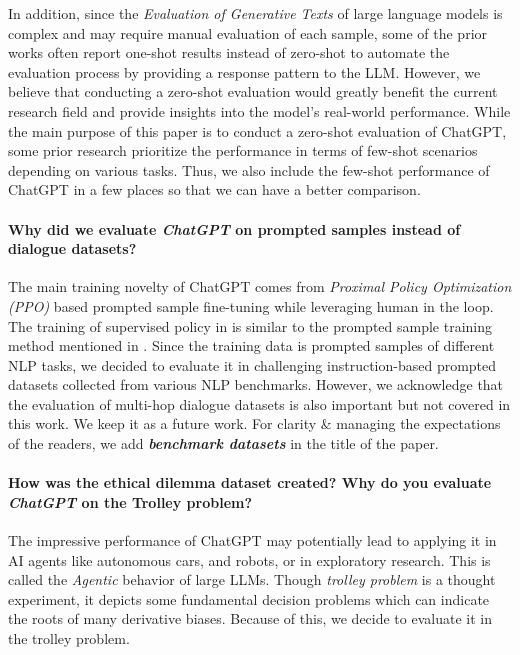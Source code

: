 \documentclass[11pt]{article}
\begin{document}
In addition, since the \emph{Evaluation of Generative Texts} of large language models is complex and may require manual evaluation of each sample, some of the prior works often report one-shot results instead of zero-shot to automate the evaluation process by providing a response pattern to the LLM. However, we believe that conducting a zero-shot evaluation would greatly benefit the current research field and provide insights into the model's real-world performance. While the main purpose of this paper is to conduct a zero-shot evaluation of ChatGPT, some prior research prioritize the performance in terms of few-shot scenarios depending on various tasks. Thus, we also include the few-shot performance of ChatGPT in a few places so that we can have a better comparison. 

\paragraph{Why did we evaluate \emph{ChatGPT} on prompted samples instead of dialogue datasets?} The main training novelty of ChatGPT comes from \emph{Proximal Policy Optimization (PPO)} based prompted sample fine-tuning while leveraging human in the loop. The training of supervised policy in \cite{instructGPT} is  similar to the prompted sample training method mentioned in \citet{T0,FLAN}.  Since the training data is prompted samples of different NLP tasks, we decided to evaluate it in challenging instruction-based prompted datasets collected from various NLP benchmarks. However, we acknowledge that the evaluation of multi-hop dialogue datasets is also important but not covered in this work. We keep it as a future work. For clarity \& managing the expectations of the readers, we add \textbf{\emph{benchmark datasets}} in the title of the paper.


\paragraph{How was the ethical dilemma dataset created? Why do you evaluate \emph{ChatGPT} on the Trolley problem?} The impressive performance of ChatGPT may potentially lead to applying it in AI agents like autonomous cars, and robots, or in exploratory research. This is called the \emph{Agentic} behavior of large LLMs. Though \emph{trolley problem} is a thought experiment, it depicts some fundamental decision problems which can indicate the roots of many derivative biases. Because of this, we decide to evaluate it in the trolley problem.
\end{document}
